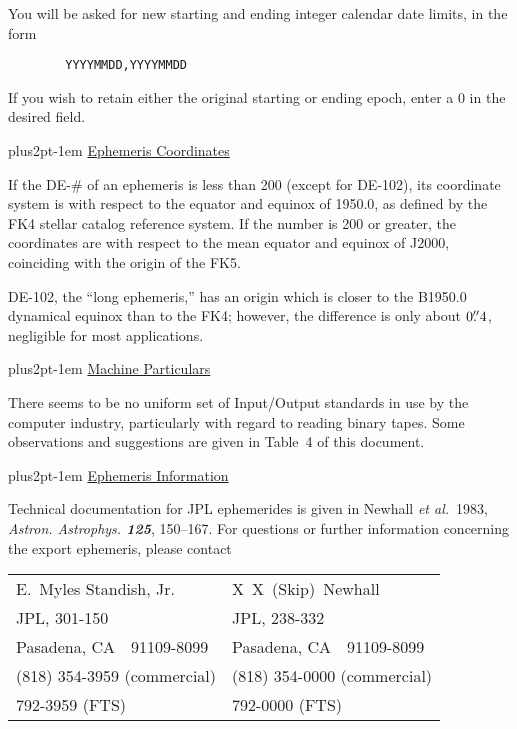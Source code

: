\documentclass[twoside,11pt]{article}
\renewcommand{\_}{\texttt{\symbol{95}}}
\newcommand{\hdg}[1]{\vskip4pt plus2pt\leavevmode\kern-1em \underline{\large{#1}}\par}
\newcommand{\hdg}[1]{\subsection*{{#1}}}
\begin{document}
You will be asked for new starting and ending integer
calendar date limits, in the form
\begin{verbatim}
        YYYYMMDD,YYYYMMDD
\end{verbatim}
If you wish to retain either the original starting or ending epoch,
enter a 0 in the desired field.
 
\hdg{Ephemeris Coordinates}

If the DE-\# of an ephemeris is less than 200 (except for DE-102),
its coordinate
system is with respect to the equator and equinox of 1950.0, as
defined by the FK4 stellar catalog reference system. If the number
is 200 or greater, the coordinates are with respect to the mean
equator and equinox of J2000, coinciding with the origin of the FK5.
 
DE-102, the ``long ephemeris,'' has an origin which is closer
to the B1950.0 dynamical equinox than to the FK4; however, the
difference is only about $0.\kern-3pt''4$, negligible for
most applications.
 
\hdg{Machine Particulars}

There seems to be no uniform set of Input/Output standards in use by
the computer industry, particularly with regard to reading
binary tapes. Some observations and suggestions are given in Table~4 of
this document.
 
\hdg{Ephemeris Information}

Technical documentation for JPL ephemerides is given in
Newhall \textit{et al.}~1983, \textit{Astron. Astrophys. \textbf{125}},
150--167.
For questions or further information concerning the export
ephemeris, please contact

\begin{center}
\begin{tabular}{ll}
E.~Myles Standish, Jr.         & X~X~(Skip)~Newhall \\
JPL, 301-150                   & JPL, 238-332 \\
Pasadena, CA\ \ 91109-8099     & Pasadena, CA\ \ 91109-8099 \\
(818) 354-3959 (commercial)    & (818) 354-0000 (commercial) \\
\phantom{(818)} 792-3959 (FTS) & \phantom{(818)} 792-0000 (FTS)
\end{tabular}
\end{center}

\end{document}
